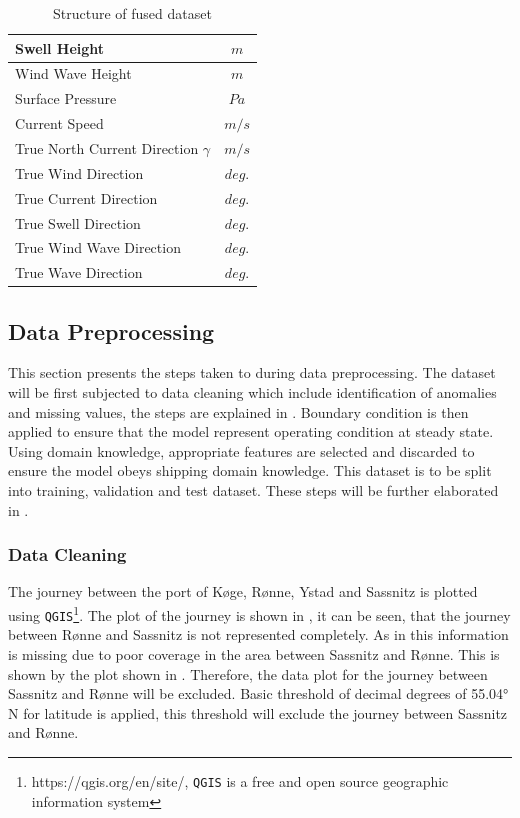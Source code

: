 \begin{table}
{\begin{tabular}{ |p{8cm}|c| }
    \hline
    Swell Height & $m$\\
    \hline
    Wind Wave Height & $m$ \\
    \hline
    Surface Pressure & $Pa$ \\
    \hline
    Current Speed & $m/s$\\
    \hline
    True North Current Direction $\gamma$ & $m/s$\\
    \hline
    True Wind Direction & $deg.$ \\
    \hline
    True Current Direction & $deg.$ \\
    \hline
    True Swell Direction & $deg.$ \\
    \hline
    True Wind Wave Direction & $deg.$ \\
    \hline
    True Wave Direction & $deg.$ \\
    \hline
    \end{tabular}}
\caption{Structure of fused dataset}\label{dataset_init_struct}
\end{table}

\subsection{Data Preprocessing}\label{data_prep}

This section presents the steps taken to during data preprocessing. The dataset will be first subjected to data cleaning which include identification of anomalies and missing values, the steps are explained in . Boundary condition is then applied to ensure that the model represent operating condition at steady state. Using domain knowledge, appropriate features are selected and discarded to ensure the model obeys shipping domain knowledge. This dataset is to be split into training, validation and test dataset. These steps will be further elaborated in .

\subsubsection{Data Cleaning}\label{data_cleaning}

The journey between the port of K{\o}ge, R{\o}nne, Ystad and Sassnitz is plotted using {\tt QGIS}\footnote{https://qgis.org/en/site/, {\tt QGIS} is a free and open source geographic information system}. The plot of the journey is shown in , it can be seen, that the journey between R{\o}nne and Sassnitz is not represented completely. As in this information is missing due to poor coverage in the area between Sassnitz and R{\o}nne. This is shown by the plot shown in . Therefore, the data plot for the journey between Sassnitz and R{\o}nne will be excluded. Basic threshold of decimal degrees of 55.04° N for latitude is applied, this threshold will exclude the journey between Sassnitz and R{\o}nne.\\ 

